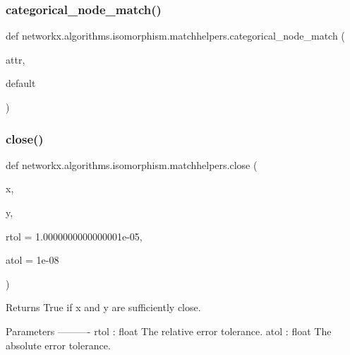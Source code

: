 \subsubsection{\texorpdfstring{categorical\+\_\+node\+\_\+match()}{categorical\_node\_match()}}
{\footnotesize\ttfamily def networkx.\+algorithms.\+isomorphism.\+matchhelpers.\+categorical\+\_\+node\+\_\+match (\begin{DoxyParamCaption}\item[{}]{attr,  }\item[{}]{default }\end{DoxyParamCaption})}

\mbox{\label{namespacenetworkx_1_1algorithms_1_1isomorphism_1_1matchhelpers_a89ea313e6d2cabbf490ba429b2f1bd4e}} 
\subsubsection{\texorpdfstring{close()}{close()}}
{\footnotesize\ttfamily def networkx.\+algorithms.\+isomorphism.\+matchhelpers.\+close (\begin{DoxyParamCaption}\item[{}]{x,  }\item[{}]{y,  }\item[{}]{rtol = {\ttfamily 1.0000000000000001e-\/05},  }\item[{}]{atol = {\ttfamily 1e-\/08} }\end{DoxyParamCaption})}

\begin{DoxyVerb}Returns True if x and y are sufficiently close.

Parameters
----------
rtol : float
    The relative error tolerance.
atol : float
    The absolute error tolerance.\end{DoxyVerb}
 \mbox{\label{namespacenetworkx_1_1algorithms_1_1isomorphism_1_1matchhelpers_a0c57c65af9335af3c771365d68062a1e}} 
